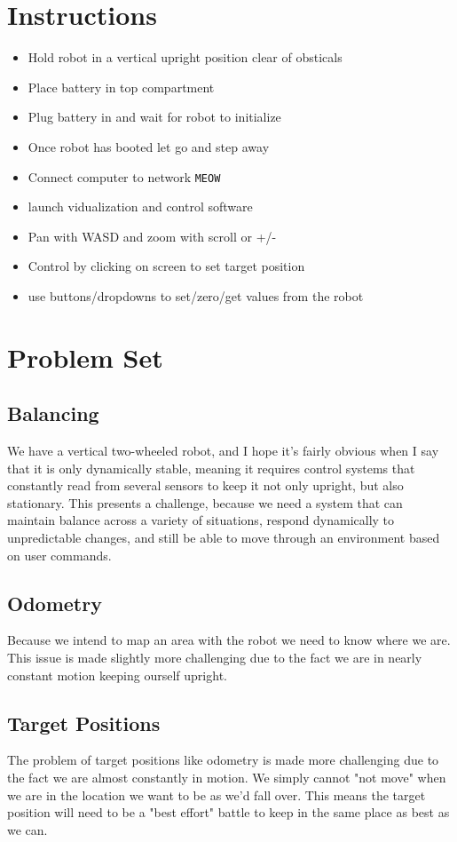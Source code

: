 \documentclass[12pt]{article}
\begin{document}
\section{Instructions}
\begin{itemize}
	\item Hold robot in a vertical upright position clear of obsticals
	\item Place battery in top compartment
	\item Plug battery in and wait for robot to initialize
	\item Once robot has booted let go and step away
	\item Connect computer to network \texttt{MEOW}
	\item launch vidualization and control software
	\item Pan with WASD and zoom with scroll or +/-
	\item Control by clicking on screen to set target position
	\item use buttons/dropdowns to set/zero/get values from the robot
\end{itemize}

\section{Problem Set}

\subsection{Balancing}
We have a vertical two-wheeled robot, and I hope it's fairly obvious when I say that it is only dynamically stable, meaning it requires control systems that constantly read from several sensors to keep it not only upright, but also stationary. This presents a challenge, because we need a system that can maintain balance across a variety of situations, respond dynamically to unpredictable changes, and still be able to move through an environment based on user commands.
\subsection{Odometry}
Because we intend to map an area with the robot we need to know where we are. This issue is made slightly more challenging due to the fact we are in nearly constant motion keeping ourself upright.
\subsection{Target Positions}
The problem of target positions like odometry is made more challenging due to the fact we are almost constantly in motion. We simply cannot "not move" when we are in the location we want to be as we'd fall over. This means the target position will need to be a "best effort" battle to keep in the same place as best as we can.
\end{document}
